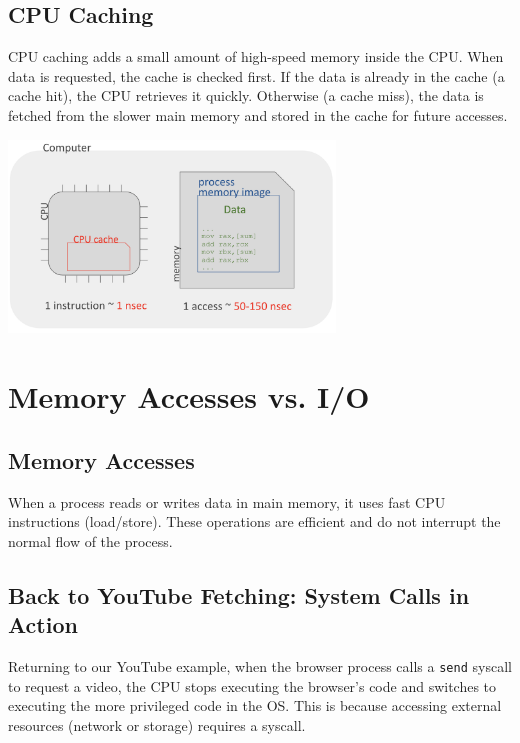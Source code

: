 \documentclass[../../compsys.tex]{subfiles}
\begin{document}
\subsection{CPU Caching}
CPU caching adds a small amount of high-speed memory inside the CPU. When data is requested, the cache is checked first. If the data is already in the cache (a cache hit), the CPU retrieves it quickly. Otherwise (a cache miss), the data is fetched from the slower main memory and stored in the cache for future accesses.

\begin{center}
  \includegraphics[width=0.65\textwidth]{chapters/L1/images/cache.png}
\end{center}

\section{Memory Accesses vs. I/O}

\subsection{Memory Accesses}
When a process reads or writes data in main memory, it uses fast CPU instructions (load/store). These operations are efficient and do not interrupt the normal flow of the process.

\subsection{Back to YouTube Fetching: System Calls in Action}

Returning to our YouTube example, when the browser process calls a \texttt{send} syscall to request a video, the CPU stops executing the browser’s code and switches to executing the more privileged code in the OS. This is because accessing external resources (network or storage) requires a syscall.
\end{document}

